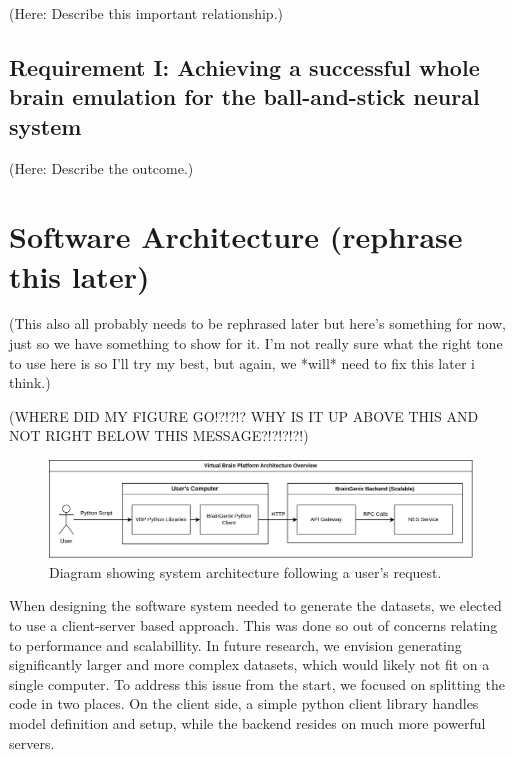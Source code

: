\documentclass{ldr-article}
\begin{document}
(Here: Describe this important relationship.)

\subsection{Requirement I: Achieving a successful whole brain emulation for the ball-and-stick neural system}

(Here: Describe the outcome.)



\section{Software Architecture (rephrase this later)}

(This also all probably needs to be rephrased later but here's something for now, just so we have something to show for it. I'm not really sure what the right tone to use here is so I'll try my best, but again, we *will* need to fix this later i think.)

(WHERE DID MY FIGURE GO!?!?!? WHY IS IT UP ABOVE THIS AND NOT RIGHT BELOW THIS MESSAGE?!?!?!?!)

\begin{figure}
    \centering
    \includegraphics[width=1\linewidth]{Figures/VBP_System_Architecture_Overview.drawio.png}
    \caption{Diagram showing system architecture following a user's request.
}
    \label{fig:system-architecture}
\end{figure}

When designing the software system needed to generate the datasets, we elected to use a client-server based approach. This was done so out of concerns relating to performance and scalabillity. In future research, we envision generating significantly larger and more complex datasets, which would likely not fit on a single computer. To address this issue from the start, we focused on splitting the code in two places. On the client side, a simple python client library handles model definition and setup, while the backend resides on much more powerful servers.
\end{document}
